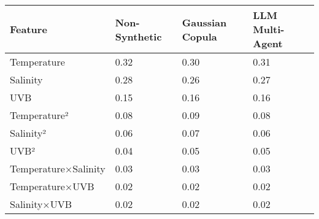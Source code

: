 \begin{tabular}{llll}
\toprule
Feature & Non-Synthetic & Gaussian Copula & LLM Multi-Agent \\
\midrule
Temperature & 0.32 & 0.30 & 0.31 \\
Salinity & 0.28 & 0.26 & 0.27 \\
UVB & 0.15 & 0.16 & 0.16 \\
Temperature² & 0.08 & 0.09 & 0.08 \\
Salinity² & 0.06 & 0.07 & 0.06 \\
UVB² & 0.04 & 0.05 & 0.05 \\
Temperature×Salinity & 0.03 & 0.03 & 0.03 \\
Temperature×UVB & 0.02 & 0.02 & 0.02 \\
Salinity×UVB & 0.02 & 0.02 & 0.02 \\
\bottomrule
\end{tabular}
